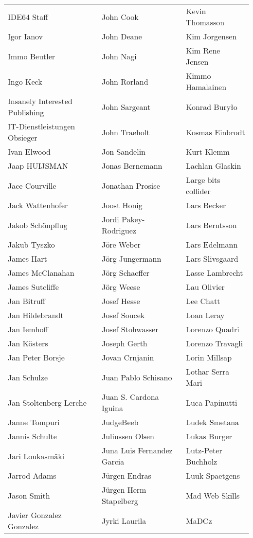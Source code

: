 \begin{tabular}{p{4.5cm}p{4.5cm}p{4.5cm}}
IDE64 Staff & John Cook & Kevin Thomasson \\
Igor Ianov & John Deane & Kim Jorgensen \\
Immo Beutler & John Nagi & Kim Rene Jensen \\
Ingo Keck & John Rorland & Kimmo Hamalainen \\
Insanely Interested Publishing & John Sargeant & Konrad Buryło \\
IT-Dienstleistungen Obsieger & John Traeholt & Kosmas Einbrodt \\
Ivan Elwood & Jon Sandelin & Kurt Klemm \\
Jaap HUIJSMAN & Jonas Bernemann & Lachlan Glaskin \\
Jace Courville & Jonathan Prosise & Large bits collider \\
Jack Wattenhofer & Joost Honig & Lars Becker \\
Jakob Schönpflug & Jordi Pakey-Rodriguez & Lars Berntsson \\
Jakub Tyszko & Jöre Weber & Lars Edelmann \\
James Hart & Jörg Jungermann & Lars Slivsgaard \\
James McClanahan & Jörg Schaeffer & Lasse Lambrecht \\
James Sutcliffe & Jörg Weese & Lau Olivier \\
Jan Bitruff & Josef Hesse & Lee Chatt \\
Jan Hildebrandt & Josef Soucek & Loan Leray \\
Jan Iemhoff & Josef Stohwasser & Lorenzo Quadri \\
Jan Kösters & Joseph Gerth & Lorenzo Travagli \\
Jan Peter Borsje & Jovan Crnjanin & Lorin Millsap \\
Jan Schulze & Juan Pablo Schisano & Lothar Serra Mari \\
Jan Stoltenberg-Lerche & Juan S. Cardona Iguina & Luca Papinutti \\
Janne Tompuri & JudgeBeeb & Ludek Smetana \\
Jannis Schulte & Juliussen Olsen & Lukas Burger \\
Jari Loukasmäki & Juna Luis Fernandez Garcia & Lutz-Peter Buchholz \\
Jarrod Adams & Jürgen Endras & Luuk Spaetgens \\
Jason Smith & Jürgen Herm Stapelberg & Mad Web Skills \\
Javier Gonzalez Gonzalez & Jyrki Laurila & MaDCz \\

\end{tabular}
